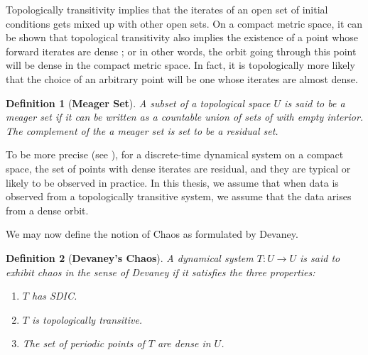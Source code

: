 \documentclass[a4paper,12pt,twoside]{report}
\newtheorem{Definition}{Definition}[]
\begin{document}
Topologically transitivity implies that the iterates of an open set of initial conditions gets mixed up with other open sets. On a compact metric space, it can be shown that topological transitivity also implies the existence of a point whose forward iterates are dense \cite{de2013elements}; or in other words, the orbit going through this point will be dense in the compact metric space. 
In fact, it is topologically more likely that the choice of an arbitrary point will be one  whose iterates are almost dense. 

\begin{Definition}
  [\bf {Meager Set}]\label{Dfn_Meager Set}\rm
A subset of a topological space $U$ is said to be a meager set if it can be written as a countable union of sets of with empty interior. The complement of the a meager set is set to be a residual set.
\end{Definition}

To be more precise (see \cite{de2013elements}), for a discrete-time dynamical system on a compact space, the set of points with dense iterates are residual, and they are typical or likely to be observed in practice. In this thesis, we assume that when data is observed from a topologically transitive system, we assume that the data arises from a dense orbit. 


We may now define the notion of Chaos as formulated by Devaney\cite{devaney2018introduction}.
\begin{Definition}
  [\bf {Devaney's Chaos}]\label{Dfn_ChaosDec}\rm
	A dynamical system $T: U \to U$ is said to exhibit chaos in the sense of Devaney if it satisfies the three properties:
	\vspace{-5mm}
  \begin{enumerate}
		\item $T$ has SDIC.
		\item $T$ is topologically transitive.
		\item The set of periodic points of $T$ are dense in $U$. 
	\end{enumerate}
\end{Definition}
\end{document}
